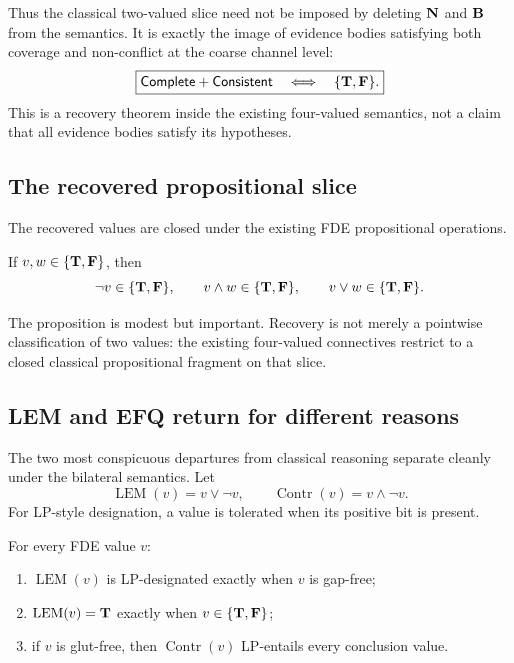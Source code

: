 Thus the classical two-valued slice need not be imposed by deleting \(\mathbf{N}\) and
\(\mathbf{B}\) from the semantics.  It is exactly the image of evidence bodies satisfying
both coverage and non-conflict at the coarse channel level:
\[
  \boxed{
  \mathsf{Complete}+\mathsf{Consistent}
  \quad\Longleftrightarrow\quad
  \{\mathbf{T},\mathbf{F}\}.}
\]
This is a recovery theorem inside the existing four-valued semantics, not a claim
that all evidence bodies satisfy its hypotheses.

\subsection{The recovered propositional slice}

The recovered values are closed under the existing FDE propositional operations.

\begin{proposition}
\label{prop:classical-recovery-subalgebra}
If \(v,w\in\{\mathbf{T},\mathbf{F}\}\), then
\[
  \neg v\in\{\mathbf{T},\mathbf{F}\},\qquad
  v\land w\in\{\mathbf{T},\mathbf{F}\},\qquad
  v\lor w\in\{\mathbf{T},\mathbf{F}\}.
\]
\statusverified
\end{proposition}

The proposition is modest but important.  Recovery is not merely a pointwise
classification of two values: the existing four-valued connectives restrict to a
closed classical propositional fragment on that slice.

\subsection{LEM and EFQ return for different reasons}

The two most conspicuous departures from classical reasoning separate cleanly under
the bilateral semantics.  Let
\[
  \operatorname{LEM}(v)=v\lor\neg v,
  \qquad
  \operatorname{Contr}(v)=v\land\neg v.
\]
For LP-style designation, a value is tolerated when its positive bit is present.

\begin{proposition}
\label{prop:lem-efq-separated-recovery}
For every FDE value \(v\):
\begin{enumerate}[label=(\roman*)]
  \item \(\operatorname{LEM}(v)\) is LP-designated exactly when \(v\) is gap-free;
  \item \(\operatorname{LEM}(v)=\mathbf{T}\) exactly when
        \(v\in\{\mathbf{T},\mathbf{F}\}\);
  \item if \(v\) is glut-free, then
        \(\operatorname{Contr}(v)\) LP-entails every conclusion value.
\end{enumerate}
\statusverified
\end{proposition}

